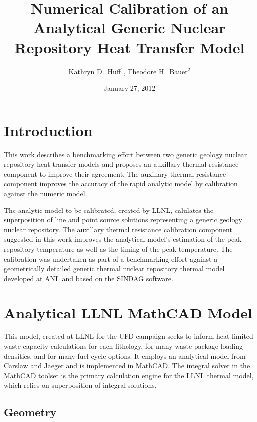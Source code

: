 \documentclass{anstrans}
\title{Numerical Calibration of an Analytical Generic Nuclear Repository Heat 
Transfer Model}
\author{Kathryn D.~Huff$^1$, Theodore H.~Bauer$^2$}
\institute{$^1$Nuclear Engineering \& Engineering Physics Dept., University of 
Wisconsin, Madison, WI, 53706\\
$^2$Nuclear Engineering Division, Argonne National Laboratory, Argonne, IL, 
60439}
\date{January 27, 2012}
\begin{document}
\section{Introduction}

This work describes a benchmarking effort between two generic geology nuclear 
repository heat transfer models and proposes an auxillary thermal resistance 
component to improve their agreement. The auxillary thermal resistance component 
improves the accuracy of the rapid analytic model by calibration against
the numeric model. 

The analytic model to be calibrated, created by \gls{LLNL}, calulates the 
superposition of line and point source solutions representing a generic geology 
nuclear repository. The auxillary thermal resistance calibration component 
suggested in this work improves the analytical model's estimation of the peak 
repository temperature as well as the timing of the peak temperature. The 
calibration was undertaken as part of a benchmarking effort against a 
geometrically detailed generic thermal nuclear repository thermal model 
developed at \gls{ANL} and based on the \gls{SINDAG} software\cite{SINDAG}.




\section{Analytical LLNL MathCAD Model}

This model, created at \gls{LLNL} for the \gls{UFD} campaign seeks to inform 
heat limited waste capacity calculations for each lithology, for many waste 
package loading densities, and for many fuel cycle options. It employs an 
analytical model from Carslaw and Jaeger and is implemented in MathCAD. 
\cite{carslaw} The integral solver in the MathCAD toolset is the primary 
calculation engine for the LLNL thermal model, which relies on superposition of 
integral solutions.  

\subsection{Geometry}
\end{document}
